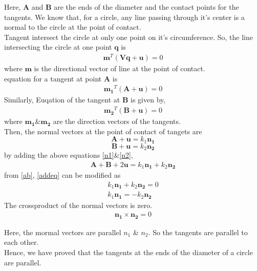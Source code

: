 \documentclass[journal,12pt,twocolumn]{article}
\let\vec\mathbf
\begin{document}
Here, $\vec{A}$ and $\vec{B}$ are the ends of the diameter and the contact points for the tangents.
We know that, for a circle, any line passing through it's center is a normal to the circle at the point of contact.\\
Tangent intersect the circle at only one point on it's circumference.
So, the line intersecting the circle at one point $\vec{q}$ is 
\begin{align}
	\boldsymbol{m}^{T}(\boldsymbol{Vq} + \boldsymbol{u}) = 0
\end{align}
where $\boldsymbol{m}$ is the directional vector of line at the point of contact.\\
equation for a tangent at point $\vec{A}$ is
\begin{align}
	\boldsymbol{m_1}^{T}(\boldsymbol{A} + \boldsymbol{u}) = 0
	\label{eqn:t1}
\end{align}
Similarly, Euqation of the tangent at $\boldsymbol{B}$ is given by,
\begin{align}
	\boldsymbol{m_2}^{T}(\boldsymbol{B} + \boldsymbol{u}) = 0
	\label{eqn:t2}
\end{align}
where $\vec{m_1}$\&$\vec{m_2}$ are the direction vectors of the tangents.\\
Then, the normal vectors at the point of contact of tangets are
\begin{equation}
	\vec{A}+\vec{u} = k_1\vec{n_1}
	\label{n1}
\end{equation}
\begin{equation}
	\vec{B}+\vec{u} = k_2\vec{n_2}
	\label{n2}
\end{equation}
by adding the above equations \eqref{n1}\&\eqref{n2}, 
\begin{align}
	\vec{A}+\vec{B} + 2\vec{u} = k_1\vec{n_1}+k_2\vec{n_2}
	\label{addeq}
\end{align}
from \eqref{ab}, \eqref{addeq} can be modified as 
 \begin{align}
	 k_1\vec{n_1}+k_2\vec{n_2} = 0 \\
	k_1\vec{n_1} = -k_2\vec{n_2}
 \end{align}
The crossproduct of the normal vectors is zero.
\begin{align}
	\vec{n_1} \times \vec{n_2} = 0
\end{align}

Here, the mormal vectors are parallel $n_1$ \& $n_2$. So the tangents are parallel to each other.\\
Hence, we have proved that the tangents at the ends of the diameter of a circle are parallel.
\end{document}
